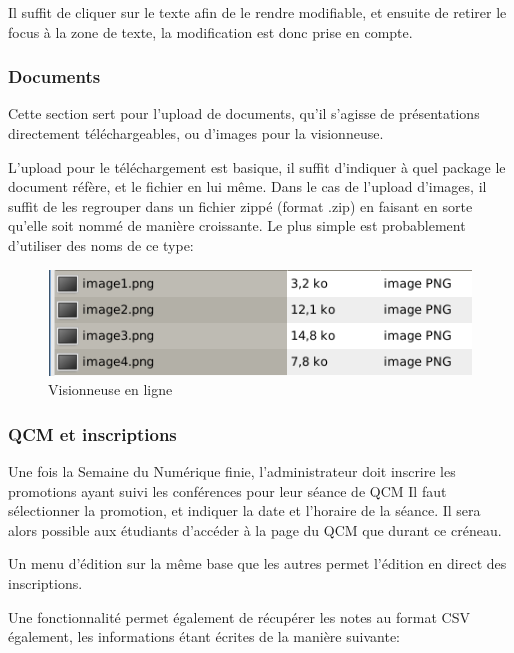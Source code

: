 Il suffit de cliquer sur le texte afin de le rendre modifiable, et ensuite de retirer
le focus à la zone de texte, la modification est donc prise en compte.

            \subsubsection{Documents}

Cette section sert pour l'upload de documents, qu'il s'agisse de présentations directement téléchargeables, ou d'images pour la visionneuse.

L'upload pour le téléchargement est basique, il suffit d'indiquer à quel package le document réfère, et le fichier en lui même.
Dans le cas de l'upload d'images, il suffit de les regrouper dans un fichier zippé (format .zip) en faisant en sorte qu'elle soit
nommé de manière croissante. Le plus simple est probablement d'utiliser des noms de ce type:

    \begin{figure}[h]
        \begin{center}
        \includegraphics[scale=0.4]{images/screenshotImages.png} 
        \end{center}
        \caption{Visionneuse en ligne}
        \label{Visionneuse en ligne}
    \end{figure}

            \subsubsection{QCM et inscriptions}

Une fois la Semaine du Numérique finie, l'administrateur doit inscrire les promotions ayant suivi les conférences pour leur
séance de QCM Il faut sélectionner la promotion, et indiquer la date et l'horaire de la séance. Il sera alors possible aux étudiants d'accéder à la page du QCM que durant ce créneau.

Un menu d'édition sur la même base que les autres permet l'édition en direct des inscriptions.

Une fonctionnalité permet également de récupérer les notes au format CSV également, les informations étant écrites de la manière suivante:

